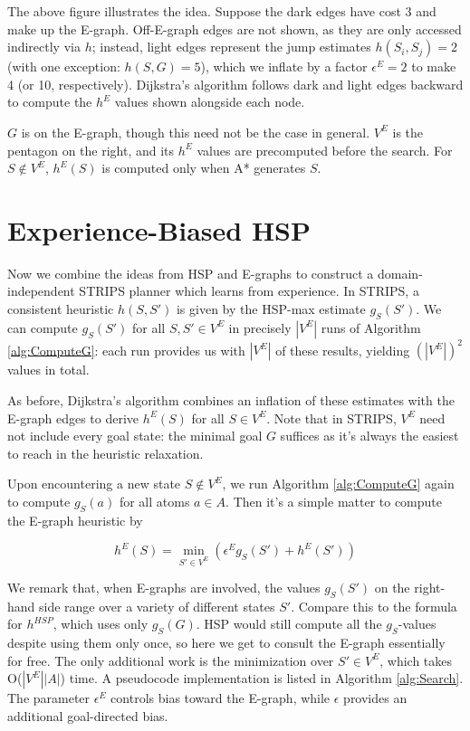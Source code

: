 \documentclass[letterpaper]{article}
\begin{document}
The above figure illustrates the idea. Suppose the dark edges have cost 3 and make up the E-graph. Off-E-graph edges are not shown, as they are only accessed indirectly via $h$; instead, light edges represent the jump estimates $h(S_i,S_j) = 2$ (with one exception: $h(S,G) = 5$), which we inflate by a factor $\epsilon^E=2$ to make 4 (or 10, respectively). Dijkstra's algorithm follows dark and light edges backward to compute the $h^E$ values shown alongside each node.

$G$ is on the E-graph, though this need not be the case in general. $V^E$ is the pentagon on the right, and its $h^E$ values are precomputed before the search. For $S\notin V^E$, $h^E(S)$ is computed only when A* generates $S$.

\section{Experience-Biased HSP}

Now we combine the ideas from HSP and E-graphs to construct a domain-independent STRIPS planner which learns from experience. In STRIPS, a consistent heuristic $h(S,S')$ is given by the HSP-max estimate $g_S(S')$. We can compute $g_S(S')$ for all $S,S'\in V^E$ in precisely $|V^E|$ runs of Algorithm \ref{alg:ComputeG}: each run provides us with $|V^E|$ of these results, yielding $(|V^E|)^2$ values in total.

As before, Dijkstra's algorithm combines an inflation of these estimates with the E-graph edges to derive $h^E(S)$ for all $S\in V^E$. Note that in STRIPS, $V^E$ need not include every goal state: the minimal goal $G$ suffices as it's always the easiest to reach in the heuristic relaxation.

Upon encountering a new state $S\notin V^E$, we run Algorithm \ref{alg:ComputeG} again to compute $g_S(a)$ for all atoms $a\in A$. Then it's a simple matter to compute the E-graph heuristic by

\[h^E(S) = \min_{S'\in V^E} \left( \epsilon^E g_S(S') + h^E(S') \right)\]

We remark that, when E-graphs are involved, the values $g_S(S')$ on the right-hand side range over a variety of different states $S'$. Compare this to the formula for $h^{HSP}$, which uses only $g_S(G)$. HSP would still compute all the $g_S$-values despite using them only once, so here we get to consult the E-graph essentially for free. The only additional work is the minimization over $S'\in V^E$, which takes O($|V^E||A|$) time. A pseudocode implementation is listed in Algorithm \ref{alg:Search}. The parameter $\epsilon^E$ controls bias toward the E-graph, while $\epsilon$ provides an additional goal-directed bias.
\end{document}
